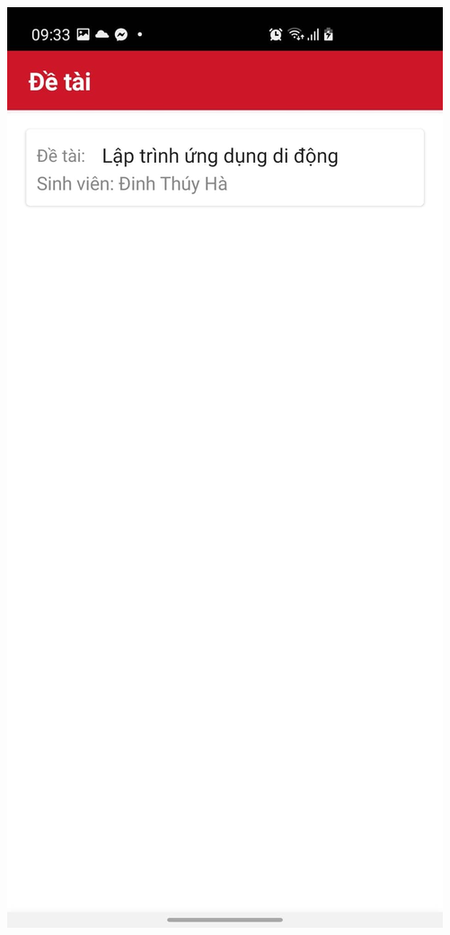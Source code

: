 \documentclass[../Main.tex]{subfiles}
\begin{document}
\begin{minipage}{0.5\textwidth}
\includegraphics[width=0.67\linewidth]{Figure/screen/ds_de_tai_cua_project.jpeg}
 \label{Figure/screen/information_topic}
\end{minipage}
\hspace{\fill}
\end{document}
